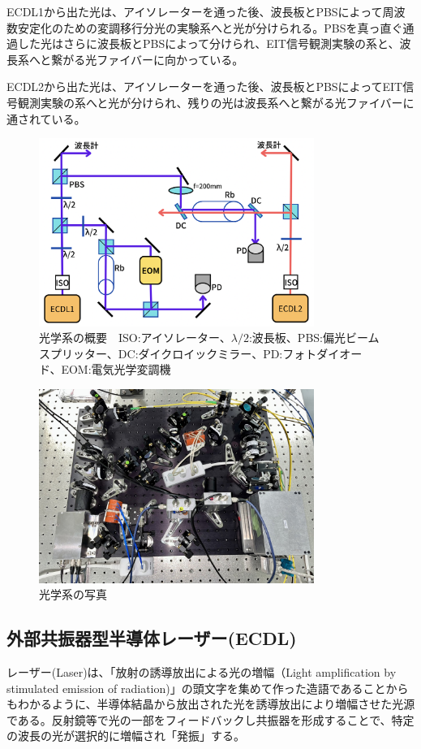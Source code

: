 \documentclass[dvipdfmx]{jsarticle}
\begin{document}
ECDL1から出た光は、アイソレーターを通った後、波長板とPBSによって周波数安定化のための変調移行分光の実験系へと光が分けられる。PBSを真っ直ぐ通過した光はさらに波長板とPBSによって分けられ、EIT信号観測実験の系と、波長系へと繋がる光ファイバーに向かっている。

ECDL2から出た光は、アイソレーターを通った後、波長板とPBSによってEIT信号観測実験の系へと光が分けられ、残りの光は波長系へと繋がる光ファイバーに通されている。

\begin{figure}[hbtp]
\centering
\includegraphics[width=0.8\textwidth]{images/all.png}
\caption{\label{fig:all}光学系の概要　ISO:アイソレーター、$\lambda / 2$:波長板、PBS:偏光ビームスプリッター、DC:ダイクロイックミラー、PD:フォトダイオード、EOM:電気光学変調機}
\end{figure}

\begin{figure}[hbtp]
\centering
\includegraphics[width=0.8\textwidth]{images/all_real.jpg}
\caption{\label{fig:all_real}光学系の写真}
\end{figure}

\subsection{外部共振器型半導体レーザー(ECDL)}
レーザー(Laser)は、「放射の誘導放出による光の増幅（Light amplification by stimulated emission of radiation)」の頭文字を集めて作った造語であることからもわかるように、半導体結晶から放出された光を誘導放出により増幅させた光源である。反射鏡等で光の一部をフィードバックし共振器を形成することで、特定の波長の光が選択的に増幅され「発振」する。\cite{yamamotomasashi}
\end{document}
